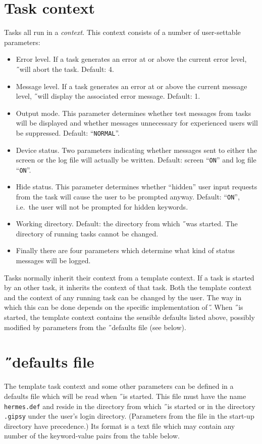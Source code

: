 \section{Task context}
Tasks all run in a {\em context\/}. This context consists of a number of
user-settable parameters:
\begin{itemize}
\item
Error level. If a task generates an error at or above the current error level,
\H\ will abort the task. Default: 4.
\item
Message level. If a task generates an error at or above the current message
level,
\H\ will display the associated error message. Default: 1.
\item
Output mode. This parameter determines whether test messages from tasks will be
displayed and whether messages unnecessary for experienced users will be
suppressed. Default: ``{\tt NORMAL}''.
\item
Device status. Two parameters indicating whether messages sent to either the
screen or the log file will actually be written.
Default: screen ``{\tt ON}'' and log file ``{\tt ON}''.
\item
Hide status. This parameter determines whether ``hidden'' user input requests
from the task will cause the user to be prompted anyway. Default: ``{\tt ON}'',
i.e.\ the user will not be prompted for hidden keywords.
\item
Working directory. Default: the directory from which \H\ was started.
The directory of running tasks cannot be changed.
\item
Finally there are four parameters which determine what kind of status messages
will be logged.
\end{itemize}
Tasks normally inherit their context from a template context. If a task is
started by an other task, it inherits the context of that task.
Both the template context and the context of any running task can be changed by
the user. The way in which this can be done depends on the specific
implementation of \H.
When \H\ is started, the template context contains the sensible defaults
listed above, possibly modified by parameters from the \H\ defaults file
(see below).

\section{\H\ defaults file}
The template task context and some other parameters can be defined in a
defaults file which will be read when \H\ is started.
This file must have the name {\tt hermes.def} and reside in the directory
from which \H\ is started or in the directory {\tt .gipsy} under the user's
login directory. (Parameters
from the file in the start-up directory have precedence.)
Its format is a text file which may contain any number of the keyword-value
pairs from the table below.

